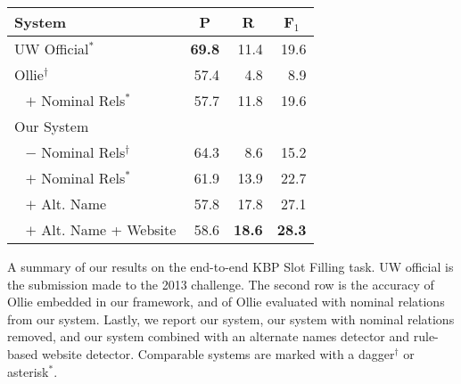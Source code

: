 \begin{table}
\begin{center}
\begin{tabular}{lrrr}
\hline
\textbf{System}                & \multicolumn{1}{c}{\textbf{P}}    
                               & \multicolumn{1}{c}{\textbf{R}}    
                               & \multicolumn{1}{c}{\textbf{F$_1$}} \\
\hline
UW Official$^*$                & \textbf{69.8} & 11.4          & 19.6 \\
\hline
Ollie$^\dagger$                & 57.4          & 4.8           & 8.9  \\
$~~$ $+$ Nominal Rels$^*$        & 57.7          & 11.8          & 19.6 \\
\hline
Our System                     & ~~~~          & ~~~           & ~~~  \\
$~~$ $-$ Nominal Rels$^\dagger$  & 64.3          & 8.6           & 15.2 \\
$~~$ $+$ Nominal Rels$^*$        & 61.9          & 13.9          & 22.7 \\
$~~$ $+$ Alt. Name               & 57.8          & 17.8          & 27.1 \\
$~~$ $+$ Alt. Name + Website     & 58.6          & \textbf{18.6} & \textbf{28.3} \\
\hline
\end{tabular}
\end{center}
{\label{tab:results}
A summary of our results on the end-to-end KBP Slot Filling task.
UW official is the submission made to the 2013 challenge.
The second row is the accuracy of Ollie embedded in our framework,
  and of Ollie evaluated with nominal relations from our system.
Lastly, we report our system, our system with nominal relations removed,
  and our system combined with an alternate names detector and rule-based
  website detector.
Comparable systems are marked with a dagger$^\dagger$ or  asterisk$^*$.
}
\end{table}


